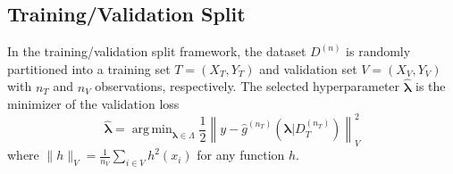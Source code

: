 \documentclass[12pt]{article}
\DeclareMathOperator*{\argmin}{arg\,min}
\begin{document}
\subsection{Training/Validation Split}

In the training/validation split framework, the dataset $D^{(n)}$ is randomly partitioned into a training set $T = (X_T, Y_T)$ and validation set $V = (X_V, Y_V)$ with $n_T$ and $n_V$ observations, respectively. The selected hyperparameter $\hat{\boldsymbol{\lambda}}$ is the minimizer of the validation loss
\begin{equation}
\label{eq:train_val_lambda}
\hat{\boldsymbol \lambda} = \argmin_{\boldsymbol{\lambda} \in\Lambda} \frac{1}{2} \left \| y-\hat{g}^{(n_T)}( \boldsymbol \lambda | D_T^{(n_T)}) \right \|_{V}^{2}
\end{equation}
where $\| h \|_{V}=\frac{1}{n_V}\sum_{i\in V} h^2(x_i)$ for any function $h$. 
\end{document}
